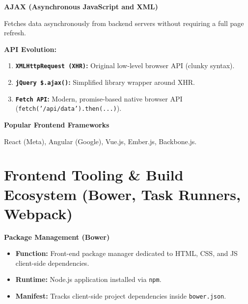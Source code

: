 \documentclass[8pt, a4paper]{article}
\begin{document}
\begin{conceptbox}
\textbf{AJAX (Asynchronous JavaScript and XML)}

Fetches data asynchronously from backend servers without requiring a full page refresh.

\smallskip
\textbf{API Evolution:}
\begin{enumerate}
  \item \textbf{\texttt{XMLHttpRequest (XHR)}:} Original low-level browser API (clunky syntax).
  \item \textbf{\texttt{jQuery \$.ajax()}:} Simplified library wrapper around XHR.
  \item \textbf{\texttt{Fetch API}:} Modern, promise-based native browser API
        (\texttt{fetch('/api/data').then(...)}).
\end{enumerate}
\end{conceptbox}

\begin{conceptbox}
\textbf{Popular Frontend Frameworks}

React (Meta), Angular (Google), Vue.js, Ember.js, Backbone.js.
\end{conceptbox}

\section{Frontend Tooling \& Build Ecosystem (Bower, Task Runners, Webpack)}

\begin{conceptbox}
\textbf{Package Management (Bower)}
\begin{itemize}
  \item \textbf{Function:} Front-end package manager dedicated to HTML, CSS, and JS client-side dependencies.
  \item \textbf{Runtime:} Node.js application installed via \texttt{npm}.
  \item \textbf{Manifest:} Tracks client-side project dependencies inside \texttt{bower.json}.
\end{itemize}
\end{conceptbox}
\end{document}

